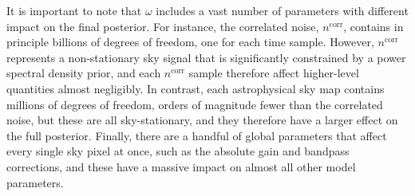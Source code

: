 \documentclass[twocolumn]{aa}
\newcommand{\red}[0]{\color{red}}
\begin{document}
It is important to note that $\omega$ includes a vast number of
parameters with different impact on the final posterior. For instance, the correlated
noise, $n^{\mathrm{corr}}$, contains in principle billions of degrees
of freedom, one for each time sample. {\red However,
  $n^{\mathrm{corr}}$ represents a non-stationary sky signal that is
  significantly constrained by a power spectral density prior, and
  each $n^{\mathrm{corr}}$ sample therefore} affect higher-level
quantities almost negligibly. In contrast, each astrophysical sky map
contains millions of degrees of freedom, {\red orders of magnitude
  fewer than the correlated noise, but these are all sky-stationary,
  and they} therefore have a larger effect on the full
posterior. {\red Finally, there are a handful of global parameters
  that affect every single sky pixel at once, such as the absolute
  gain and bandpass corrections, and these} have a massive impact on
almost all other model parameters.
\end{document}
